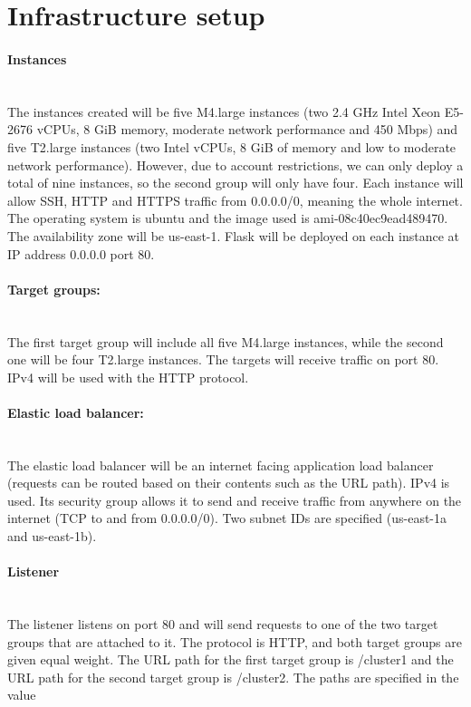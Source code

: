 \documentclass[11pt]{article}
\title{}
\author{}
\date{}
\begin{document}
\maketitle

\section{Infrastructure setup}

\paragraph{Instances}\mbox{}\\
The instances created will be five M4.large instances (two 2.4 GHz Intel Xeon E5-2676 vCPUs, 8 GiB memory, moderate network performance and 450 Mbps) and five T2.large instances (two Intel vCPUs, 8 GiB of memory and low to moderate network performance). However, due to account restrictions, we can only deploy a total of nine instances, so the second group will only have four. Each instance will allow SSH, HTTP and HTTPS traffic from 0.0.0.0/0, meaning the whole internet. The operating system is ubuntu and the image used is ami-08c40ec9ead489470. The availability zone will be us-east-1. Flask will be deployed on each instance at IP address 0.0.0.0 port 80.

\paragraph{Target groups:}\mbox{}\\
The first target group will include all five M4.large instances, while the second one will be four T2.large instances. The targets will receive traffic on port 80. IPv4 will be used with the HTTP protocol.

\paragraph{Elastic load balancer:}\mbox{}\\
The elastic load balancer will be an internet facing application load balancer (requests can be routed based on their contents such as the URL path). IPv4 is used. Its security group allows it to send and receive traffic from anywhere on the internet (TCP to and from 0.0.0.0/0). Two subnet IDs are specified (us-east-1a and us-east-1b).

\paragraph{Listener}\mbox{}\\
The listener listens on port 80 and will send requests to one of the two target groups that are attached to it. The protocol is HTTP, and both target groups are given equal weight. The URL path for the first target group is /cluster1 and the URL path for the second target group is /cluster2. The paths are specified in the value
\end{document}
